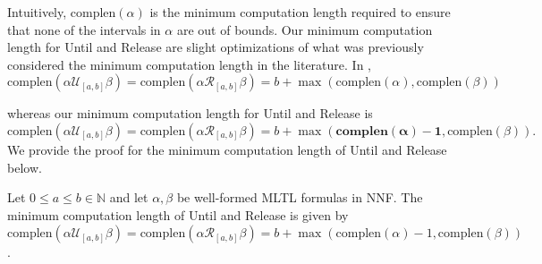 \documentclass[runningheads]{llncs}
\begin{document}
Intuitively, $\text{complen}(\alpha)$ is the minimum computation length required to ensure that none of the intervals in $\alpha$ are out of bounds.
Our minimum computation length for Until and Release are slight optimizations of what was previously considered the minimum computation length in the literature. In \cite{KZJZR20}, $$\text{complen}(\alpha \mathcal{U}_{[a,b]} \beta) = \text{complen}(\alpha \mathcal{R}_{[a,b]} \beta) = b + \max(\text{complen}(\alpha), \text{complen}(\beta))$$
 
whereas our minimum computation length for Until and Release is 
$$\text{complen}(\alpha \mathcal{U}_{[a,b]} \beta) = \text{complen}(\alpha \mathcal{R}_{[a,b]} \beta) = b + \max(\mathbf{\text{complen}(\alpha)-1}, \text{complen}(\beta)).$$
We provide the proof for the minimum computation length of Until and Release below.
\begin{theorem}
    Let $0 \leq a\leq b \in \mathbb{N}$ and let $\alpha, \beta$ be well-formed MLTL formulas in NNF. The minimum computation length of Until and Release is given by $\text{complen}(\alpha \mathcal{U}_{[a,b]} \beta) = \text{complen}(\alpha \mathcal{R}_{[a,b]} \beta) = b + \max(\text{complen}(\alpha)-1, \text{complen}(\beta))$.
\end{theorem}
\end{document}
